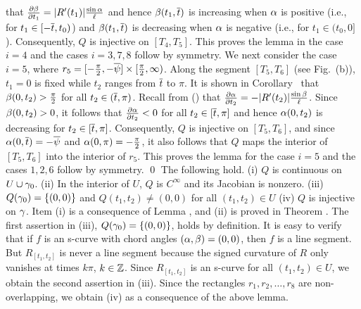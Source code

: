 that $\frac{\partial\beta}{\partial t_1}=|R'(t_1)|\frac{\sin\alpha}\ell$ and hence
$\beta(t_1,\overline t)$ is increasing when $\alpha$ is positive (i.e., for $t_1\in[-\overline t,t_0)$) and
$\beta(t_1,\overline t)$ is decreasing when $\alpha$ is negative (i.e., for $t_1\in(t_0,0]$).  Consequently,
$Q$ is injective on $[T_4,T_5]$. This proves the lemma in the case $i=4$ and the cases $i=3,7,8$ follow
by symmetry.\newline
We next consider the case $i=5$, where $r_5=[-\frac\pi2,-\overline \psi]\times [\frac\pi2,\infty)$. Along the segment $[T_5,T_6]$
(see Fig.\ \figten(b)), $t_1=0$ is fixed while $t_2$ ranges from $\overline t$ to $\pi$.
It is shown in Corollary \cortbar\ that
$\beta(0,t_2)>\frac\pi2$ for all $t_2\in(\overline t,\pi)$. Recall from (\elalphar)
that  $\frac{\partial\alpha}{\partial t_2}=-|R'(t_2)|\frac{\sin\beta}\ell$. Since $\beta(0,t_2)>0$, it follows that
$\frac{\partial\alpha}{\partial t_2}<0$ for all $t_2\in[\overline t,\pi]$ and hence $\alpha(0,t_2)$ is decreasing for
$t_2\in[\overline t,\pi]$. Consequently, $Q$ is injective on $[T_5,T_6]$, and since $\alpha(0,\overline t)=-\overline \psi$ and
$\alpha(0,\pi)=-\frac\pi2$, it also follows that $Q$ maps the interior of $[T_5,T_6]$ into the interior of $r_5$.
This proves the lemma for the case $i=5$ and the cases $1,2,6$ follow by symmetry.
\qed\enddemo
%
 The following hold.\newline
(i) $Q$ is continuous on $U\cup \gamma_0$.\newline
(ii) In the interior of $U$, $Q$ is $C^\infty$ and its Jacobian is nonzero.\newline
(iii) $Q(\gamma_0)=\{(0,0)\}$ and $Q(t_1,t_2)\neq (0,0)$ for all $(t_1,t_2)\in U$\newline
(iv) $Q$ is injective on $\gamma$.
\endproclaim
%
 Item (i) is a consequence of Lemma \december, and (ii) is proved in Theorem \detq.
The first assertion in (iii), $Q(\gamma_0)=\{(0,0)\}$, holds by definition.  It is easy to verify that if $f$ is
an s-curve with chord angles $(\alpha,\beta)=(0,0)$, then $f$ is a line segment. But $R_{[t_1,t_2]}$ is
never a line segment because the signed curvature of $R$ only vanishes at times $k\pi$, $k\in\Bbb Z$. Since
$R_{[t_1,t_2]}$ is an s-curve for all $(t_1,t_2)\in U$, we obtain the second assertion in (iii).  Since the rectangles
$r_1,r_2,\ldots,r_8$ are non-overlapping, we obtain (iv) as a consequence of the above lemma.

